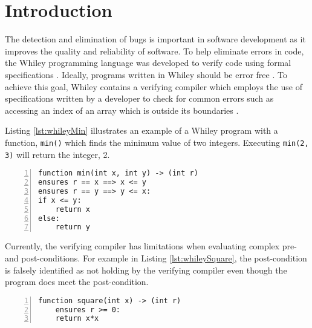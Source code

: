 \section{Introduction}\label{section:intro}



The detection and elimination of bugs is important in software development as it improves the quality and reliability of software.
To help eliminate errors in code, the Whiley programming language was developed to verify code using formal specifications \cite{WhileyLang}.
Ideally, programs written in Whiley should be error free \cite{WhileyLang}.
To achieve this goal, Whiley contains a verifying compiler which employs the use of specifications written by a developer to check for common errors such as accessing an index of an array which is outside its boundaries \cite{WhileyLang}.

Listing \ref{lst:whileyMin} illustrates an example of a Whiley program with a function,  \texttt{min()} which finds the minimum value of two integers. Executing \texttt{min(2, 3)} will return the integer, 2.

\begin{lstlisting}[language=Whiley, tabsize=3, numbers=left,
label={lst:whileyMin}, caption={Whiley program for the min function}]
function min(int x, int y) -> (int r)
ensures r == x ==> x <= y
ensures r == y ==> y <= x:
if x <= y:
	return x
else:
	return y
\end{lstlisting}

Currently, the verifying compiler has limitations when evaluating complex pre- and post-conditions.
For example in Listing \ref{lst:whileySquare}, the post-condition is falsely identified as not holding by the verifying compiler even though the program does meet the post-condition.

\begin{lstlisting}[language=Whiley, tabsize=3, numbers=left,
label={lst:whileySquare}, caption={Whiley program for the square function}]
function square(int x) -> (int r)
	ensures r >= 0:
	return x*x
\end{lstlisting}

